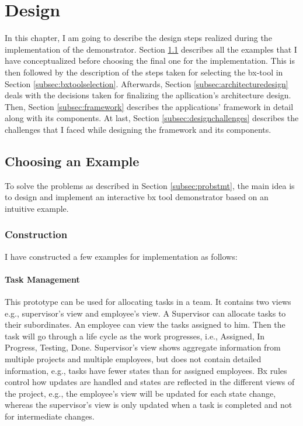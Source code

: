 \section{Design}\label{sec:design}
In this chapter, I am going to describe the design steps realized during the implementation of the demonstrator. Section \ref{subsec:exampleforimplementation} describes all the examples that I have conceptualized before choosing the final one for the implementation. This is then followed by the description of the steps taken for selecting the bx-tool in Section \ref{subsec:bxtoolselection}. Afterwards, Section \ref{subsec:architecturedesign} deals with the decisions taken for finalizing the apllication's architecture design. Then, Section \ref{subsec:framework} describes the applications' framework in detail along with its components. At last, Section \ref{subsec:designchallenges} describes the challenges that I faced while designing the framework and its components.

\subsection{Choosing an Example}\label{subsec:exampleforimplementation}
To solve the problems as described in Section \ref{subsec:probstmt}, the main idea is to design and implement an interactive bx tool demonstrator based on an intuitive example.

\subsubsection{Construction}\label{subsubsec:exampleconstruction}
I have constructed a few examples for implementation as follows:

\paragraph{Task Management} This prototype can be used for allocating tasks in a team. It contains two views e.g., supervisor's view and employee's view. A Supervisor can allocate tasks to their subordinates. An employee can view the tasks assigned to him. Then the task will go through a life cycle as the work progresses, i.e., Assigned, In Progress, Testing, Done. Supervisor's view shows aggregate information from multiple projects and multiple employees, but does not contain detailed information, e.g., tasks have fewer states than for assigned employees. Bx rules control how updates are handled and states are reflected in the different views of the project, e.g., the employee's view will be updated for each state change, whereas the supervisor's view is only updated when a task is completed and not for intermediate changes.

